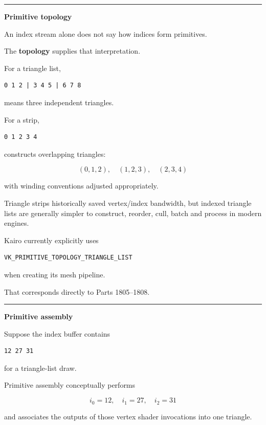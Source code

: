 \begin{center}\rule{0.5\linewidth}{0.5pt}\end{center}

\textbf{Primitive topology}

An index stream alone does not say how indices form primitives.

The \textbf{topology} supplies that interpretation.

For a triangle list,

\begin{verbatim}
0 1 2 | 3 4 5 | 6 7 8
\end{verbatim}

means three independent triangles.

For a strip,

\begin{verbatim}
0 1 2 3 4
\end{verbatim}

constructs overlapping triangles:

\[
(0,1,2),\quad
(1,2,3),\quad
(2,3,4)
\]

with winding conventions adjusted appropriately.

Triangle strips historically saved vertex/index bandwidth, but indexed triangle lists are generally simpler to construct, reorder, cull, batch and process in modern engines.

Kairo currently explicitly uses

\begin{verbatim}
VK_PRIMITIVE_TOPOLOGY_TRIANGLE_LIST
\end{verbatim}

when creating its mesh pipeline.

That corresponds directly to Parts 1805--1808.

\begin{center}\rule{0.5\linewidth}{0.5pt}\end{center}

\textbf{Primitive assembly}

Suppose the index buffer contains

\begin{verbatim}
12 27 31
\end{verbatim}

for a triangle-list draw.

Primitive assembly conceptually performs

\[
i_0=12,\quad i_1=27,\quad i_2=31
\]

and associates the outputs of those vertex shader invocations into one triangle.

